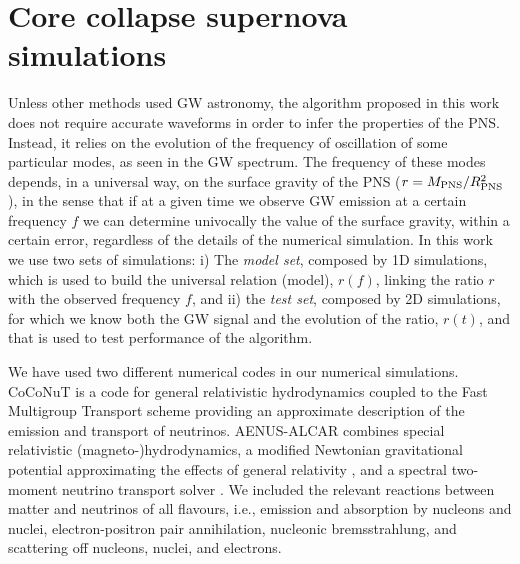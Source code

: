 \section{Core collapse supernova simulations}
\label{sec:simulations}



{Unless other methods used GW astronomy, the} algorithm proposed in {this work} does not require accurate
waveforms {in order to infer the properties of the PNS.} {Instead, it relies on the evolution of the frequency of
oscillation of some particular modes, as seen in the GW spectrum. The frequency of these modes depends, in a universal way, 
on the surface gravity of the PNS ($r=M_{\rm PNS}/R_{\rm PNS}^2$), in the sense that if at a given time we observe GW emission
at a certain frequency $f$ we can determine univocally the value of the surface gravity, within a certain error, regardless of the details
of the numerical simulation. In this work we use two sets of simulations: i) The {\it model set}, composed by 1D simulations, which is used 
to build the universal relation (model), $r(f)$, linking the ratio $r$ with the observed frequency $f$, and ii) the {\it test set}, composed by 2D simulations, 
for which we know both the GW signal and the evolution of the ratio, $r (t)$, and that is used to test performance of the algorithm.}

{We have used two different numerical codes in our numerical simulations.} 
CoCoNuT
\citep{Dimmelmeier:2002,Dimmelmeier:2005} is a code for general
relativistic hydrodynamics coupled to the Fast Multigroup Transport
scheme \citep{Mueller_Janka_2015_FMT} providing an approximate
description of the emission and transport of neutrinos. AENUS-ALCAR
\citep{Just_et_al__2015__mnras__Anewmultidimensionalenergy-dependenttwo-momenttransportcodeforneutrino-hydrodynamics}
combines special relativistic (magneto-)hydrodynamics, a modified
Newtonian gravitational potential approximating the effects of general
relativity \citep{Marek_etal__2006__AA__TOV-potential}, and a spectral
two-moment neutrino transport solver
\citep{Just_et_al__2015__mnras__Anewmultidimensionalenergy-dependenttwo-momenttransportcodeforneutrino-hydrodynamics}.
We included the relevant reactions between matter and neutrinos of all
flavours, i.e., emission and absorption by nucleons and nuclei,
electron-positron pair annihilation, nucleonic bremsstrahlung, and
scattering off nucleons, nuclei, and electrons.

